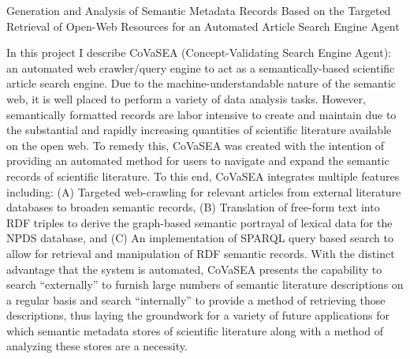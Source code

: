 \documentclass[12pt]{article}
\begin{document}
\thispagestyle{empty}
\begin{center}

\noindent
Generation and Analysis of Semantic Metadata Records Based on the Targeted Retrieval of Open-Web Resources for an Automated Article Search Engine Agent

\end{center}
\vspace{2.5mm}

In this project I describe CoVaSEA (Concept-Validating Search Engine Agent): an automated web crawler/query engine to act as a semantically-based scientific article search engine. Due to the machine-understandable nature of the semantic web, it is well placed to perform a variety of data analysis tasks. However, semantically formatted records are labor intensive to create and maintain due to the substantial and rapidly increasing quantities of scientific literature available on the open web. To remedy this, CoVaSEA was created with the intention of providing an automated method for users to navigate and expand the semantic records of scientific literature. To this end, CoVaSEA integrates multiple features including: (A) Targeted web-crawling for relevant articles from external literature databases to broaden semantic records, (B) Translation of free-form text into RDF triples to derive the graph-based semantic portrayal of lexical data for the NPDS database, and (C) An implementation of SPARQL query based search to allow for retrieval and manipulation of RDF semantic records. With the distinct advantage that the system is automated, CoVaSEA presents the capability to search “externally” to furnish large numbers of semantic literature descriptions on a regular basis and search “internally” to provide a method of retrieving those descriptions, thus laying the groundwork for a variety of future applications for which semantic metadata stores of scientific literature along with a method of analyzing these stores are a necessity.
\end{document}
